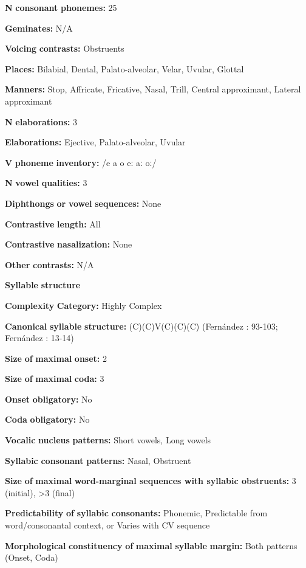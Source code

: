 \textbf{N} \textbf{consonant} \textbf{phonemes:} 25

\textbf{Geminates:} N/A

\textbf{Voicing} \textbf{contrasts:} Obstruents

\textbf{Places:} Bilabial, Dental, Palato-alveolar, Velar, Uvular, Glottal

\textbf{Manners:} Stop, Affricate, Fricative, Nasal, Trill, Central approximant, Lateral approximant

\textbf{N} \textbf{elaborations:} 3

\textbf{Elaborations:} Ejective, Palato-alveolar, Uvular

\textbf{V} \textbf{phoneme} \textbf{inventory:} /e a o eː aː oː/

\textbf{N} \textbf{vowel} \textbf{qualities:} 3

\textbf{Diphthongs} \textbf{or} \textbf{vowel} \textbf{sequences:} None

\textbf{Contrastive} \textbf{length:} All

\textbf{Contrastive} \textbf{nasalization:} None

\textbf{Other} \textbf{contrasts:} N/A

\textbf{Syllable} \textbf{structure}

\textbf{Complexity} \textbf{Category:} Highly Complex

\textbf{Canonical} \textbf{syllable} \textbf{structure:} (C)(C)V(C)(C)(C) (Fernández \citealt{Garay1998}: 93-103; Fernández \citealt{GarayHernández2006}: 13-14)

\textbf{Size} \textbf{of} \textbf{maximal} \textbf{onset:} 2

\textbf{Size} \textbf{of} \textbf{maximal} \textbf{coda:} 3

\textbf{Onset} \textbf{obligatory:} No

\textbf{Coda} \textbf{obligatory:} No

\textbf{Vocalic} \textbf{nucleus} \textbf{patterns:} Short vowels, Long vowels

\textbf{Syllabic} \textbf{consonant} \textbf{patterns:} Nasal, Obstruent

\textbf{Size} \textbf{of} \textbf{maximal} \textbf{word{}-marginal sequences with syllabic obstruents:} 3 (initial), >3 (final)

\textbf{Predictability} \textbf{of} \textbf{syllabic} \textbf{consonants:} Phonemic, Predictable from word/consonantal context, or Varies with CV sequence

\textbf{Morphological} \textbf{constituency} \textbf{of} \textbf{maximal} \textbf{syllable} \textbf{margin:} Both patterns (Onset, Coda)

